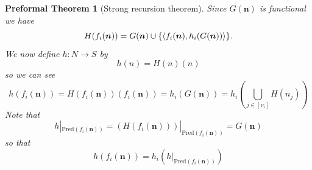 \documentclass[oneside, 12pt]{book}
\theoremstyle{break}
\newtheorem{preformal definition}[definition]{Preformal Definition}
\newtheorem{preformal theorem}[theorem]{Preformal Theorem}
\newcommand{\bv}[1]{\boldsymbol{#1}}
\begin{document}
\begin{preformal theorem}[Strong recursion theorem]
				Since $G(\bv{n})$ is functional we have
				\begin{equation*}
					H(f_i(\bv{n})) = G(\bv{n}) \cup \{\braket{f_i(\bv{n}), h_i(G(\bv{n}))}\}.
				\end{equation*}
				We now define $h: N \to S$ by
				\begin{equation*}
					h(n) = H(n)(n)
				\end{equation*}
				so we can see
				\begin{equation*}
					h(f_i(\bv{n})) = H(f_i(\bv{n}))(f_i(\bv{n})) = h_i(G(\bv{n})) = h_i\left(\bigcup_{j\in [\nu_i]} H(n_j)\right)
				\end{equation*}
				Note that
				\begin{equation*}
					h|_{\text{Pred}(f_i(\bv{n}))} = \left(H(f_i(\bv{n}))\right)|_{\text{Pred}(f_i(\bv{n}))} = G(\bv{n})
				\end{equation*}
				so that
				\begin{equation*}
					h(f_i(\bv{n})) = h_i(h|_{\text{Pred}(f_i(\bv{n}))})
				\end{equation*}
				

				
				
				
			\end{preformal theorem}
					
\end{document}
